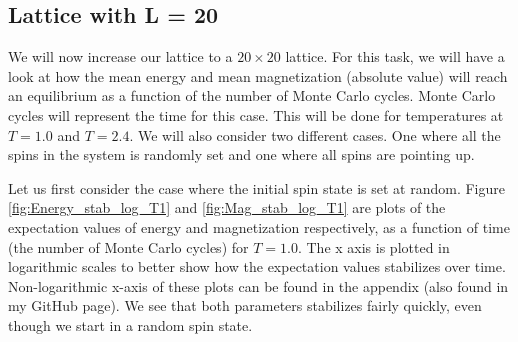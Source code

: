 \documentclass[12pt]{article}
\begin{document}
\subsection{Lattice with L = 20}
We will now increase our lattice to a $20\times 20$ lattice.  For this task, we will have a look at how the mean energy and mean magnetization (absolute value) will reach an equilibrium as a function of the number of Monte Carlo cycles. Monte Carlo cycles will represent the time for this case. This will be done for temperatures at $T=1.0$ and $T = 2.4$. We will also consider two different cases. One where all the spins in the system is randomly set and one where all spins are pointing up.
 
Let us first consider the case where the initial spin state is set at random. Figure \ref{fig:Energy_stab_log_T1} and \ref{fig:Mag_stab_log_T1} are plots of the expectation values of energy and magnetization respectively, as a function of time (the number of Monte Carlo cycles) for $T = 1.0$. The x axis is plotted in logarithmic scales to better show how the  expectation values stabilizes over time. Non-logarithmic x-axis of these plots can be found in the appendix (also found in my GitHub page). We see that both parameters stabilizes fairly quickly, even though we start in a random spin state.
\end{document}
